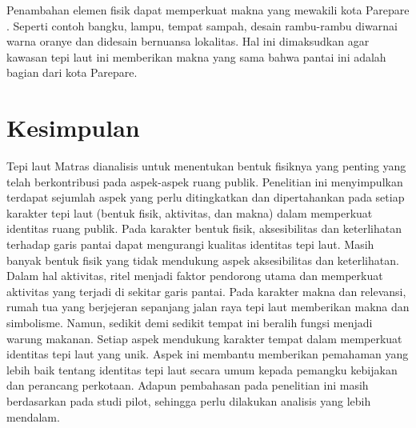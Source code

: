 \documentclass[11pt]{simart} %
\begin{document}
Penambahan elemen fisik dapat memperkuat makna yang mewakili kota Parepare \citep{atika2022}. Seperti contoh bangku, lampu, tempat sampah, desain rambu-rambu diwarnai warna oranye dan didesain bernuansa lokalitas. Hal ini dimaksudkan agar kawasan tepi laut ini memberikan makna yang sama bahwa pantai ini adalah bagian dari kota Parepare.



\section{Kesimpulan}%
\label{sec:Kesimpulan}

Tepi laut Matras dianalisis untuk menentukan bentuk fisiknya yang penting yang telah berkontribusi pada aspek-aspek ruang publik. Penelitian ini menyimpulkan terdapat sejumlah aspek yang perlu ditingkatkan dan dipertahankan pada setiap karakter tepi laut (bentuk fisik, aktivitas, dan makna) dalam memperkuat identitas ruang publik. Pada karakter bentuk fisik, aksesibilitas dan keterlihatan terhadap garis pantai dapat mengurangi kualitas identitas tepi laut. Masih banyak bentuk fisik yang tidak mendukung aspek aksesibilitas dan keterlihatan. Dalam hal aktivitas, ritel menjadi faktor pendorong utama dan memperkuat aktivitas yang terjadi di sekitar garis pantai. Pada karakter makna dan relevansi, rumah tua yang berjejeran sepanjang jalan raya tepi laut memberikan makna dan simbolisme. Namun, sedikit demi sedikit tempat ini beralih fungsi menjadi warung makanan. Setiap aspek mendukung karakter tempat dalam memperkuat identitas tepi laut yang unik. Aspek ini membantu memberikan pemahaman yang lebih baik tentang identitas tepi laut secara umum kepada pemangku kebijakan dan perancang perkotaan. Adapun pembahasan pada penelitian ini masih berdasarkan pada studi pilot, sehingga perlu dilakukan analisis yang lebih mendalam.






% 

\end{document}
